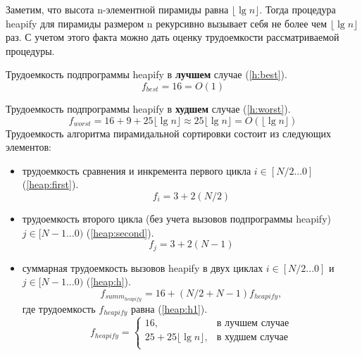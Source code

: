 Заметим, что высота n-элементной пирамиды равна $\lfloor \lg{n}\rfloor$. Тогда процедура heapify для пирамиды размером n рекурсивно вызывает себя не более чем $\lfloor \lg{n}\rfloor$ раз.
С учетом этого факта можно дать оценку трудоемкости рассматриваемой процедуры.

Трудоемкость подпрограммы heapify в \textbf{лучшем} случае (\ref{h:best}).
\begin{equation}
	\label{h:best}
	f_{best} = 16 = O(1)
\end{equation}

Трудоемкость подпрограммы heapify в \textbf{худшем} случае (\ref{h:worst}).
\begin{equation}
	\label{h:worst}
	f_{worst} = 16 + 9 + 25\lfloor \lg{n}\rfloor \approx 25\lfloor \lg{n}\rfloor = O(\lfloor \lg{n}\rfloor)
\end{equation}
\newpage
Трудоемкость алгоритма пирамидальной сортировки состоит из следующих элементов:
\begin{itemize}
	\item трудоемкость сравнения и инкремента первого цикла $i \in [N/2...0]$ (\ref{heap:first}).
	\begin{equation}
		\label{heap:first}
		f_{i} = 3 + 2(N/2)
	\end{equation}
	\item трудоемкость второго цикла (без учета вызовов подпрограммы heapify)\newline$j \in [N-1...0)$ (\ref{heap:second}).
	\begin{equation}
		\label{heap:second}
		f_{j} = 3 + 2(N-1)
	\end{equation}
	\item суммарная трудоемкость вызовов heapify в двух циклах $i \in [N/2...0]$ и $j \in [N-1...0)$  (\ref{heap:h}).
	\begin{equation}
		\label{heap:h}
		f_{summ_{heapify}} = 16 + (N/2 + N - 1)f_{heapify}, 
	\end{equation}
	где трудоемкость $f_{heapify}$ равна (\ref{heap:h1}).
	\begin{equation}
		\label{heap:h1}
		f_{heapify} = \begin{cases}
			16, & \text{в лучшем случае}\\
			25 + 25\lfloor \lg{n}\rfloor, & \text{в худшем случае}\\
		\end{cases}
	\end{equation}
\end{itemize}


